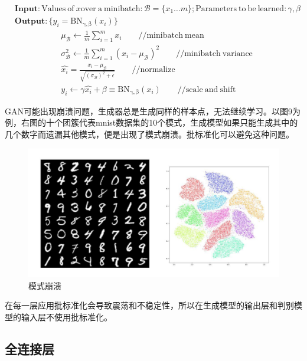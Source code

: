 \documentclass[hyperref, a4paper]{ctexart}
\begin{document}
\[\begin{aligned}&\mathbf{Input}:\mathrm{Values\ of\ } x \mathrm{over\ a\ minibatch:}\mathcal{B}=\{x_1…m\};\mathrm{Parameters\ to\ be\ learned:}\gamma,\beta \\&\mathbf{Output:}\{y_i=\mathrm{BN_{\gamma,\beta}}(x_i)\}\end{aligned}\]
\[\begin{aligned}
&\mu_\mathcal{B}\gets\frac{1}{m}\sum_{i = 1}^{m}x_i \qquad\mathrm{//minibatch\ mean} \\
&\sigma^2_\mathcal{B}\gets\frac{1}{m}\sum_{i = 1}^{m}(x_i-\mu_\mathcal{B})^2\qquad \mathrm{//minibatch\ variance} \\
&\hat{x_i} = \frac{x_i -\mu_\mathcal{B} }{\sqrt{(\sigma_\mathcal{B})^2 + \epsilon}} \qquad\mathrm{//normalize}\\
&y_i\gets\gamma\hat{x_i} + \beta\equiv\mathrm{BN_{\gamma,\beta}}(x_i)\qquad \mathrm{//scale\ and\ shift}
\end{aligned}
\]

GAN可能出现崩溃问题，生成器总是生成同样的样本点，无法继续学习。以图9为例，右图的十个团簇代表mnist数据集的10个模式，生成模型如果只能生成其中的几个数字而遗漏其他模式，便是出现了模式崩溃。批标准化可以避免这种问题。

\begin{figure}
\centering
\includegraphics{9.png}
\caption{模式崩溃}
\end{figure}

在每一层应用批标准化会导致震荡和不稳定性，所以在生成模型的输出层和判别模型的输入层不使用批标准化。

\hypertarget{ux5168ux8fdeux63a5ux5c42}{%
\subsection{全连接层}\label{ux5168ux8fdeux63a5ux5c42}}
\end{document}
